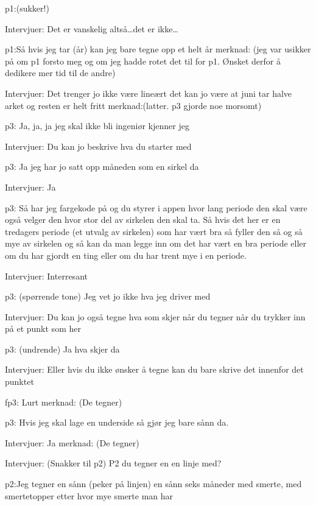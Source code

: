 \documentclass[11pt,UKenglish, a4paper]{article}
\begin{document}
\textcolor{myGreen} {p1:}(sukker!)

\textcolor{myBlue} {Intervjuer:} Det er vanskelig altså\dots det er ikke\dots

\textcolor{myGreen} {p1:}Så hvis jeg tar (år) kan jeg bare tegne opp et helt år
merknad: (jeg var usikker på om p1 forsto meg og om jeg hadde rotet det til for p1. Ønsket derfor å dedikere mer tid til de andre)

\textcolor{myBlue} {Intervjuer:} Det trenger jo ikke være lineært det kan jo være at juni tar halve arket og resten er helt fritt
merknad:(latter. p3 gjorde noe morsomt)

\textcolor{myR} {p3:} Ja, ja, ja jeg skal ikke bli ingeniør kjenner jeg

\textcolor{myBlue} {Intervjuer:} Du kan jo beskrive hva du starter med

\textcolor{myR} {p3:} Ja jeg har jo satt opp måneden som en sirkel da

\textcolor{myBlue} {Intervjuer:} Ja

\textcolor{myR} {p3:} Så har jeg fargekode på og du styrer i appen hvor lang periode den skal være også velger den hvor stor del av sirkelen den skal ta. Så hvis det her er en tredagers periode (et utvalg av sirkelen) som har vært bra så fyller den så og så mye av sirkelen og så kan da man legge inn om det har vært en bra periode eller om du har gjordt en ting eller om du har trent mye i en periode. 

\textcolor{myBlue} {Intervjuer:} Interresant

\textcolor{myR} {p3:} (spørrende tone) Jeg vet jo ikke hva jeg driver med

\textcolor{myBlue} {Intervjuer:} Du kan jo også tegne hva som skjer når du tegner når du trykker inn på et punkt som her

\textcolor{myR} {p3:} (undrende) Ja hva skjer da

\textcolor{myBlue} {Intervjuer:} Eller hvis du ikke ønsker å tegne kan du bare skrive det innenfor det punktet


f\textcolor{myR} {p3:} Lurt
merknad: (De tegner)

\textcolor{myR} {p3:} Hvis jeg skal lage en underside så gjør jeg bare sånn da. 

\textcolor{myBlue} {Intervjuer:} Ja
merknad: (De tegner)

\textcolor{myBlue} {Intervjuer:} (Snakker til p2) P2 du tegner en en linje med?

\textcolor{myYellow} {p2:}Jeg tegner en sånn (peker på linjen) en sånn seks måneder med smerte, med smertetopper etter hvor mye smerte man har
\end{document}
